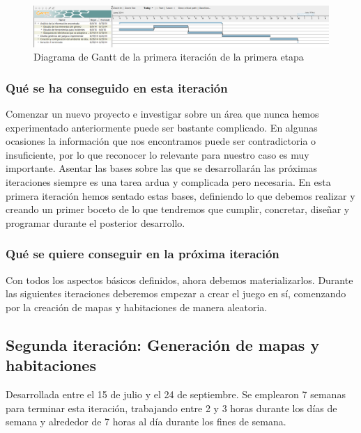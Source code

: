 \begin{figure}
    \includegraphics[width=\textwidth,height=\textheight,keepaspectratio]{./img/sec1it1.png}
  \caption{Diagrama de Gantt de la primera iteración de la primera etapa}
  \label{fig:sec1it1}
\end{figure}

\subsubsection{Qué se ha conseguido en esta iteración}

Comenzar un nuevo proyecto e investigar sobre un área que nunca hemos experimentado anteriormente puede ser bastante complicado. En algunas ocasiones la información que nos encontramos puede ser contradictoria o insuficiente, por lo que reconocer lo relevante para nuestro caso es muy importante. Asentar las bases sobre las que se desarrollarán las próximas iteraciones siempre es una tarea ardua y complicada pero necesaria. En esta primera iteración hemos sentado estas bases, definiendo lo que debemos realizar y creando un primer boceto de lo que tendremos que cumplir, concretar, diseñar y programar durante el posterior desarrollo.

\subsubsection{Qué se quiere conseguir en la próxima iteración}

Con todos los aspectos básicos definidos, ahora debemos materializarlos. Durante las siguientes iteraciones deberemos empezar a crear el juego en sí, comenzando por la creación de mapas y habitaciones de manera aleatoria.

\subsection{Segunda iteración: Generación de mapas y habitaciones}

Desarrollada entre el 15 de julio y el 24 de septiembre. Se emplearon 7 semanas para terminar esta iteración, trabajando entre 2 y 3 horas durante los días de semana y alrededor de 7 horas al día durante los fines de semana.

